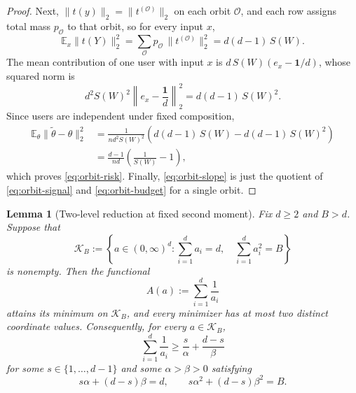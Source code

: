 \documentclass[11pt]{amsart}
\numberwithin{equation}{section}
\newtheorem{lemma}[theorem]{Lemma}
\theoremstyle{definition}
\newcommand{\E}{\mathbb E}
\newcommand{\one}{\mathbf 1}
\begin{document}
\begin{proof}
Next, \(\|t(y)\|_2=\|t^{(\mathcal O)}\|_2\) on each orbit \(\mathcal O\), and each row assigns total mass
\(p_{\mathcal O}\) to that orbit, so for every input \(x\),
\[
\E_x\|t(Y)\|_2^2
=
\sum_{\mathcal O} p_{\mathcal O}\,\|t^{(\mathcal O)}\|_2^2
=
d(d-1)\,S(W). \tag{11.9}\label{eq:orbit-second-moment}
\]
The mean contribution of one user with input \(x\) is
\(
d\,S(W)(e_x-\one/d)
\),
whose squared norm is
\[
d^2 S(W)^2
\left\|e_x-\frac{\one}{d}\right\|_2^2
=
d(d-1)\,S(W)^2.
\]
Since users are independent under fixed composition,
\[
\begin{aligned}
\E_\theta\|\widetilde\theta-\theta\|_2^2
&=
\frac{1}{nd^2 S(W)^2}
\left(
d(d-1)\,S(W)-d(d-1)\,S(W)^2
\right)\\
&=
\frac{d-1}{nd}\left(\frac{1}{S(W)}-1\right),
\end{aligned}
\]
which proves \eqref{eq:orbit-risk}.
Finally, \eqref{eq:orbit-slope} is just the quotient of \eqref{eq:orbit-signal} and \eqref{eq:orbit-budget}
for a single orbit.
\end{proof}

\begin{lemma}[Two-level reduction at fixed second moment]\label{lem:two-level-template}
Fix \(d\ge 2\) and \(B>d\).  Suppose that
\[
\mathcal K_B
:=
\left\{
a\in(0,\infty)^d:
\sum_{i=1}^d a_i=d,\quad
\sum_{i=1}^d a_i^2=B
\right\}
\]
is nonempty.  Then the functional
\[
A(a):=\sum_{i=1}^d \frac{1}{a_i}
\]
attains its minimum on \(\mathcal K_B\), and every minimizer has at most two
distinct coordinate values.  Consequently, for every \(a\in\mathcal K_B\),
\[
\sum_{i=1}^d \frac{1}{a_i}
\ge
\frac{s}{\alpha}+\frac{d-s}{\beta}
\]
for some \(s\in\{1,\dots,d-1\}\) and some \(\alpha>\beta>0\) satisfying
\[
s\alpha+(d-s)\beta=d,
\qquad
s\alpha^2+(d-s)\beta^2=B.
\]
\end{lemma}
\end{document}
